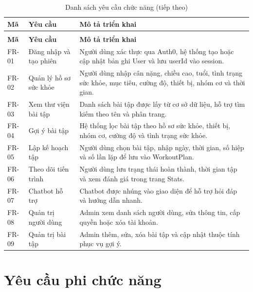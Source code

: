 \begingroup
\setlength{\tabcolsep}{3pt}
\renewcommand{\arraystretch}{1.25}
\begin{longtable}{|P{0.220\textwidth}|P{0.330\textwidth}|P{0.370\textwidth}|}
\caption{Danh sách yêu cầu chức năng}\\
\hline
\textbf{Mã} & \textbf{Yêu cầu} & \textbf{Mô tả triển khai} \\
\hline
\endfirsthead
\caption[]{Danh sách yêu cầu chức năng (tiếp theo)}\\
\hline
\textbf{Mã} & \textbf{Yêu cầu} & \textbf{Mô tả triển khai} \\
\hline
\endhead
FR-01 & Đăng nhập và tạo phiên & Người dùng xác thực qua Auth0, hệ thống tạo hoặc cập nhật bản ghi User và lưu userId vào session. \\
\hline
FR-02 & Quản lý hồ sơ sức khỏe & Người dùng nhập cân nặng, chiều cao, tuổi, tình trạng sức khỏe, mục tiêu, cường độ, thiết bị, nhóm cơ và thời gian. \\
\hline
FR-03 & Xem thư viện bài tập & Danh sách bài tập được lấy từ cơ sở dữ liệu, hỗ trợ tìm kiếm theo tên và phân trang. \\
\hline
FR-04 & Gợi ý bài tập & Hệ thống lọc bài tập theo hồ sơ sức khỏe, thiết bị, nhóm cơ, cường độ và tình trạng sức khỏe. \\
\hline
FR-05 & Lập kế hoạch tập & Người dùng chọn bài tập, nhập ngày, thời gian, số hiệp và số lần lặp để lưu vào WorkoutPlan. \\
\hline
FR-06 & Theo dõi tiến trình & Người dùng lưu trạng thái hoàn thành, thời gian tập và xem đánh giá trong trang Stats. \\
\hline
FR-07 & Chatbot hỗ trợ & Chatbot được nhúng vào giao diện để hỗ trợ hỏi đáp và hướng dẫn nhanh. \\
\hline
FR-08 & Quản trị người dùng & Admin xem danh sách người dùng, sửa thông tin, cấp quyền hoặc xóa tài khoản. \\
\hline
FR-09 & Quản trị bài tập & Admin thêm, sửa, xóa bài tập và cập nhật thuộc tính phục vụ gợi ý. \\
\hline
\end{longtable}
\endgroup

\section{Yêu cầu phi chức năng}

